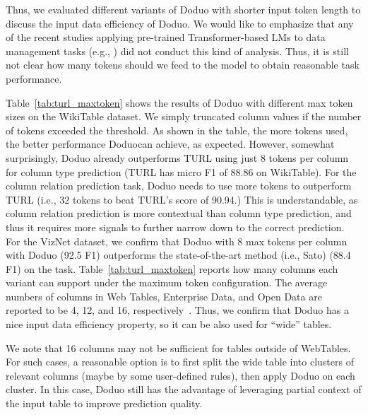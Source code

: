 \documentclass[sigconf]{acmart}
\newcommand{\name}{\mbox{\sc Doduo}}
\newcommand{\hll}[1]{#1}
\newcommand{\hlll}[1]{#1}
\newcommand{\rev}[1]{#1}
\begin{document}
Thus, we evaluated different variants of \name{} with shorter input token length to discuss the 
\hll{input} data efficiency of \name. We would like to emphasize that any of the recent studies applying pre-trained Transformer-based LMs to data management tasks (e.g., \cite{Li:2020:Ditto,Deng:2020:TURL,Trabelsi:2020:SeLaB,Wang:2021:TCN}) did not conduct this kind of analysis. Thus, it is still not clear how many tokens should we feed to the model to obtain reasonable task performance.


Table~\ref{tab:turl_maxtoken} shows the results of \name{} with different max token sizes on the WikiTable dataset. 
%
We simply truncated column values if the number of tokens exceeded the threshold.
%
As shown in the table, the more tokens used, the better performance \name can achieve, as expected. However, somewhat surprisingly, \name{} already outperforms TURL using just 8 tokens per column for column type prediction (TURL has micro F1 of 88.86 on WikiTable).
%
For the column relation prediction task, \name{} needs to use more tokens to outperform TURL (i.e., 32 tokens to beat TURL's score of 90.94.) This is understandable, as column relation prediction is more contextual than column type prediction, and thus it requires more signals to further narrow down to the correct prediction.
%
For the VizNet dataset, we confirm that \name{} with 8 max tokens per column with \name{} (92.5 F1) outperforms the state-of-the-art method (i.e., Sato) (88.4 F1) on the task. \hlll{Table~\ref{tab:turl_maxtoken} reports how many columns each variant can support under the maximum token configuration.
%
The average numbers of columns in Web Tables, Enterprise Data, and Open Data are reported to be 4, 12, and 16, respectively~\cite{Miller:2018:VLDB:OpenDataIntegration,Deng:2018:CIDR}.
%
Thus, we confirm that \name{} has a nice input data efficiency property, so it can be also used for ``wide'' tables.}

\rev{
We note that 16 columns may not be sufficient for tables outside of WebTables. 
For such cases, a reasonable option is to first split the wide table into clusters of relevant columns (maybe by some user-defined rules), then apply \name{} on each cluster. 
In this case, \name{} still has the advantage 
of leveraging partial context of the input table
to improve prediction quality.}
\end{document}
